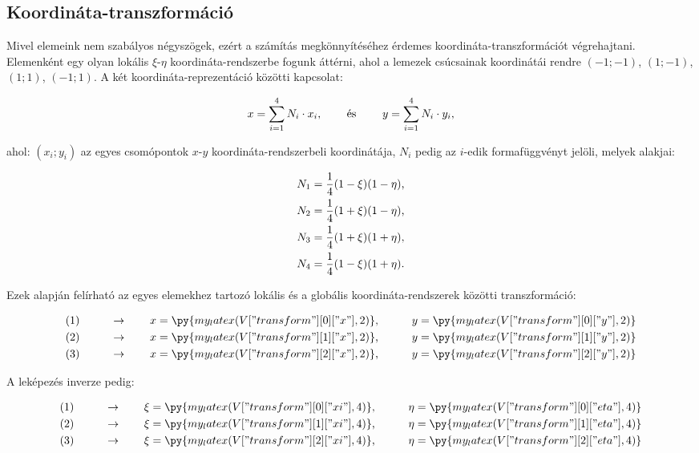 \subsection{Koordináta-transzformáció}

Mivel elemeink nem szabályos négyszögek, ezért a számítás megkönnyítéséhez
érdemes koordináta-transzformációt végrehajtani. Elemenként egy olyan lokális
$\xi$-$\eta$ koordináta-rendszerbe fogunk áttérni, ahol a lemezek csúcsainak
koordinátái rendre $(-1;-1)$, $(1;-1)$, $(1;1)$, $(-1;1)$. A két
koordináta-reprezentáció közötti kapcsolat:
\begin{myframe}
  \begin{equation}
    x = \sum_{i=1}^4 N_i \cdot x_i
    \text,
    \qquad
    \text{ és }
    \qquad
    y = \sum_{i=1}^4 N_i \cdot y_i
    \text,
  \end{equation}
\end{myframe}
ahol: $(x_i; y_i)$ az egyes csomópontok $x$-$y$ koordináta-rendszerbeli
koordinátája, $N_i$ pedig az $i$-edik formafüggvényt jelöli, melyek alakjai:
\begin{myframe}
  \begin{gather}
    N_1 = \frac{1}{4} (1 - \xi) (1 - \eta) \text, \\
    N_2 = \frac{1}{4} (1 + \xi) (1 - \eta) \text, \\
    N_3 = \frac{1}{4} (1 + \xi) (1 + \eta) \text, \\
    N_4 = \frac{1}{4} (1 - \xi) (1 + \eta) \text.
  \end{gather}
\end{myframe}
Ezek alapján felírható az egyes elemekhez tartozó lokális és a globális
koordináta-rendszerek közötti transzformáció:
\begin{myframe}
  \begin{alignat}{9}
     & (1) \qquad & \rightarrow \qquad x & = \py{my_latex(V["transform"][0]["x"],2)} \text, &  & \qquad y = \py{my_latex(V["transform"][0]["y"],2)}
    \\
     & (2) \qquad & \rightarrow \qquad x & = \py{my_latex(V["transform"][1]["x"],2)} \text, &  & \qquad y = \py{my_latex(V["transform"][1]["y"],2)}
    \\
     & (3) \qquad & \rightarrow \qquad x & = \py{my_latex(V["transform"][2]["x"],2)} \text, &  & \qquad y = \py{my_latex(V["transform"][2]["y"],2)}
  \end{alignat}
\end{myframe}
A leképezés inverze pedig:
\begin{myframe}
  \begin{alignat}{9}
     & (1) \qquad & \rightarrow \qquad \xi & = \py{my_latex(V["transform"][0]["xi"], 4)} \text, &  & \qquad \eta = \py{my_latex(V["transform"][0]["eta"], 4)}
    \\
     & (2) \qquad & \rightarrow \qquad \xi & = \py{my_latex(V["transform"][1]["xi"], 4)} \text, &  & \qquad \eta = \py{my_latex(V["transform"][1]["eta"], 4)}
    \label{eq:alma}
    \\
     & (3) \qquad & \rightarrow \qquad \xi & = \py{my_latex(V["transform"][2]["xi"], 4)} \text, &  & \qquad \eta = \py{my_latex(V["transform"][2]["eta"], 4)}
  \end{alignat}
\end{myframe}
